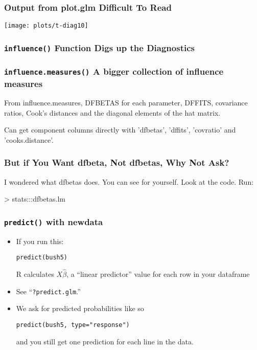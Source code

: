 \documentclass[10pt,english]{beamer}
\begin{document}
\begin{frame}[plain]
  \frametitle{Output from plot.glm Difficult To Read}

\texttt{[image: plots/t-diag10]}

\end{frame}




\begin{frame}
   \frametitle{\texttt{influence()} Function Digs up the Diagnostics}


\end{frame}

\begin{frame}
 \frametitle{\texttt{influence.measures()} A bigger collection of influence measures}

 From influence.measures, DFBETAS for each parameter, DFFITS, covariance ratios, Cook's distances and the diagonal elements of the hat matrix.




     Can get component columns directly with 'dfbetas', 'dffits', 'covratio' and 'cooks.distance'.
\end{frame}



\begin{frame}
 \frametitle{But if You Want dfbeta, Not dfbetas, Why Not Ask?}




      I wondered what dfbetas does. You can see for yourself. Look at
      the code. Run:

\begin{Schunk}\begin{Soutput}
    >  stats:::dfbetas.lm
  \end{Soutput}
\end{Schunk}

\end{frame}



\begin{frame}
  \frametitle{\texttt{predict()} with newdata}

  \begin{itemize}
    \item If you run this:

      \texttt{predict(bush5)}

    R calculates $X\hat{\beta}$, a ``linear predictor'' value for each row in your dataframe

  \item See ``\texttt{?predict.glm}.''

  \item We ask for predicted probabilities like so

    \texttt{predict(bush5, type="response")}

    and you still get one prediction for each line in the data.
  \end{itemize}
\end{frame}
\end{document}
